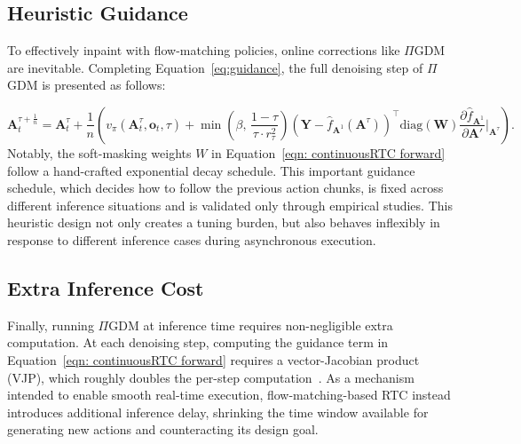 \documentclass{article}
\begin{document}
\subsection{Heuristic Guidance}
\label{sec:lim_guidance}

To effectively inpaint with flow-matching policies, online corrections like $\Pi$GDM~\citep{song2023pseudoinverse} are inevitable.
Completing Equation~\ref{eq:guidance}, the full denoising step of $\Pi$GDM is presented as follows:

\begin{equation}
\label{eqn: continuousRTC forward}
\mathbf{A}_t^{\tau+\frac{1}{n}} = \mathbf{A}_t^\tau + \frac{1}{n}\!\left(v_\pi(\mathbf{A}_t^\tau, \mathbf{o}_t, \tau) + \min\!\left(\beta,\, \frac{1-\tau}{\tau \cdot r_\tau^2}\right) \left(\mathbf{Y} - \hat{f}_{\mathbf{A}^1}(\mathbf{A}^\tau)\right)^\top \text{diag}(\mathbf{W}) \frac{\partial \hat{f}_{\mathbf{A}^1}}{\partial \mathbf{A}'}\bigg|_{\mathbf{A}^\tau} \right).
\end{equation}
Notably, the soft-masking weights $W$ in Equation~\ref{eqn: continuousRTC forward} follow a hand-crafted exponential decay schedule.
This important guidance schedule, which decides how to follow the previous action chunks, is fixed across different inference situations and is validated only through empirical studies.
This heuristic design not only creates a tuning burden, but also behaves inflexibly in response to different inference cases during asynchronous execution.

\subsection{Extra Inference Cost}
\label{sec:lim_cost}
Finally, running $\Pi$GDM at inference time requires non-negligible extra computation.
At each denoising step, computing the guidance term in Equation~\ref{eqn: continuousRTC forward} requires a vector-Jacobian product (VJP), which roughly doubles the per-step computation~\citep{wang2026real}. As a mechanism intended to enable smooth real-time execution, flow-matching-based RTC instead introduces additional inference delay, shrinking the time window available for generating new actions and counteracting its design goal.
\end{document}
